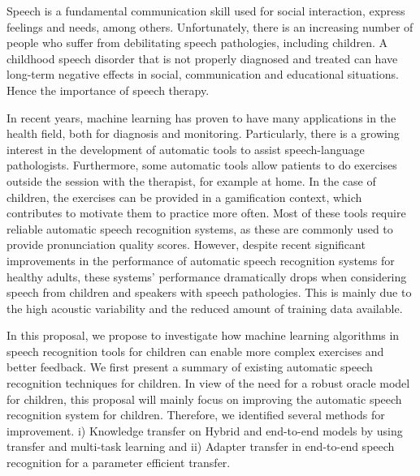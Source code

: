 \acresetall
\noindent Speech is a fundamental communication skill used for social interaction, express feelings and needs, among others. Unfortunately, there is an increasing number of people who suffer from debilitating speech pathologies, including children. A childhood speech disorder that is not properly diagnosed and treated can have long-term negative effects in social, communication and educational situations. Hence the importance of speech therapy.

In recent years, machine learning has proven to have many applications in the health field, both for diagnosis and monitoring. Particularly, there is a growing interest in the development of automatic tools to assist speech-language pathologists. Furthermore, some automatic tools allow patients to do exercises outside the session with the therapist, for example at home. In the case of children, the exercises can be provided in a gamification context, which contributes to motivate them to practice more often. Most of these tools require reliable automatic speech recognition systems, as these are commonly used to provide pronunciation quality scores. However, despite recent significant improvements in the performance of automatic speech recognition systems for healthy adults, these systems' performance dramatically drops when considering speech from children and speakers with speech pathologies. This is mainly due to the high acoustic variability and the reduced amount of training data available.

In this proposal, we propose to investigate how machine learning algorithms in speech recognition tools for children can enable more complex exercises and better feedback. We first present a summary of existing automatic speech recognition techniques for children. In view of the need for a robust oracle model for children, this proposal will mainly focus on improving the automatic speech recognition system for children. Therefore, we identified several methods for improvement. i) Knowledge transfer on Hybrid and end-to-end models by using transfer and multi-task learning and ii) Adapter transfer in end-to-end speech recognition for a parameter efficient transfer.
\newpage